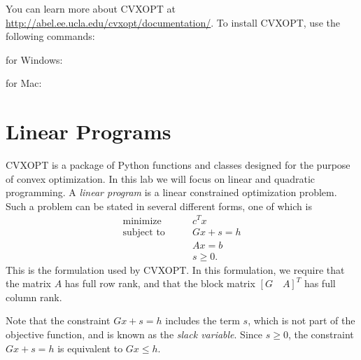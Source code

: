 \label{lab:Optimization 2}

You can learn more about CVXOPT at
\url{http://abel.ee.ucla.edu/cvxopt/documentation/}.
To install CVXOPT, use the following commands:

for Windows: 

for Mac: 

\section*{Linear Programs}

CVXOPT is a package of Python functions and classes designed for the purpose of convex optimization.
In this lab we will focus on linear and quadratic programming.
A \emph{linear program} is a linear constrained optimization problem. Such a problem can be stated in several
different forms, one of which is
\begin{align*}
\text{minimize}\qquad &c^Tx \\
\text{subject to}\qquad &Gx + s = h\\
&Ax = b \\
 &s \geq 0.
\end{align*}
This is the formulation used by CVXOPT.
In this formulation, we require that the matrix $A$ has full row rank,
and that the block matrix $[G \quad A]^T$ has full column rank.

Note that the constraint $Gx +s = h$ includes the term $s$, which is not part of the objective
function, and is known as the \emph{slack variable}. Since $s  \geq 0$, the constraint
$Gx + s = h$ is equivalent to $Gx \leq h$.

\begin{comment}
The corresponding \emph{dual program} for the above linear program has the form
\begin{align*}
\text{maximize}\qquad &-h^Tz - b^Ty \\
\text{subject to}\qquad &G^Tz + A^Ty + c = 0\\
 &z \geq 0.
\end{align*}
CVXOPT provides functions to solve both the original (\emph{primal}) linear program and its dual program.
\end{comment}


